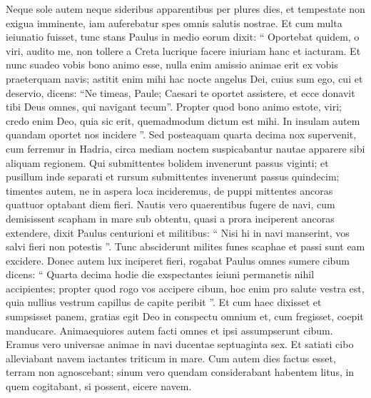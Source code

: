 \begin{biblechapter}
\begin{biblechapter}
\begin{biblechapter}
\begin{biblechapter}
\begin{biblechapter}
\begin{biblechapter}
\begin{biblechapter}
\begin{biblechapter}
\begin{biblechapter}
\begin{biblechapter}
\begin{biblechapter}
\begin{biblechapter}
\begin{biblechapter}
\begin{biblechapter}
\begin{biblechapter}
\begin{biblechapter}
\begin{biblechapter}
\begin{biblechapter}
\begin{biblechapter}
\begin{biblechapter}
\begin{biblechapter}
\begin{biblechapter}
\begin{biblechapter}
\begin{biblechapter}
\begin{biblechapter}
\begin{biblechapter}
\begin{biblechapter}
\verse Neque sole autem neque sideribus apparentibus per plures dies, et tempestate non exigua imminente, iam auferebatur spes omnis salutis nostrae.
 \verse Et cum multa ieiunatio fuisset, tunc stans Paulus in medio eorum dixit: “ Oportebat quidem, o viri, audito me, non tollere a Creta lucrique facere iniuriam hanc et iacturam. 
\verse Et nunc suadeo vobis bono animo esse, nulla enim amissio animae erit ex vobis praeterquam navis; 
\verse astitit enim mihi hac nocte angelus Dei, cuius sum ego, cui et deservio, 
\verse dicens: “Ne timeas, Paule; Caesari te oportet assistere, et ecce donavit tibi Deus omnes, qui navigant tecum”. 
\verse Propter quod bono animo estote, viri; credo enim Deo, quia sic erit, quemadmodum dictum est mihi. 
\verse In insulam autem quandam oportet nos incidere ”. 
\verse Sed posteaquam quarta decima nox supervenit, cum ferremur in Hadria, circa mediam noctem suspicabantur nautae apparere sibi aliquam regionem. 
\verse Qui submittentes bolidem invenerunt passus viginti; et pusillum inde separati et rursum submittentes invenerunt passus quindecim; 
\verse timentes autem, ne in aspera loca incideremus, de puppi mittentes ancoras quattuor optabant diem fieri. 
\verse Nautis vero quaerentibus fugere de navi, cum demisissent scapham in mare sub obtentu, quasi a prora inciperent ancoras extendere, 
\verse dixit Paulus centurioni et militibus: “ Nisi hi in navi manserint, vos salvi fieri non potestis ”. 
\verse Tunc absciderunt milites funes scaphae et passi sunt eam excidere.
 \verse Donec autem lux inciperet fieri, rogabat Paulus omnes sumere cibum dicens: “ Quarta decima hodie die exspectantes ieiuni permanetis nihil accipientes; 
\verse propter quod rogo vos accipere cibum, hoc enim pro salute vestra est, quia nullius vestrum capillus de capite peribit ”. 
\verse Et cum haec dixisset et sumpsisset panem, gratias egit Deo in conspectu omnium et, cum fregisset, coepit manducare. 
\verse Animaequiores autem facti omnes et ipsi assumpserunt cibum. 
 \verse Eramus vero universae animae in navi ducentae septuaginta sex. 
\verse Et satiati cibo alleviabant navem iactantes triticum in mare.
 \verse Cum autem dies factus esset, terram non agnoscebant; sinum vero quendam considerabant habentem litus, in quem cogitabant, si possent, eicere navem. 

\end{biblechapter}
\end{biblechapter}
\end{biblechapter}
\end{biblechapter}
\end{biblechapter}
\end{biblechapter}
\end{biblechapter}
\end{biblechapter}
\end{biblechapter}
\end{biblechapter}
\end{biblechapter}
\end{biblechapter}
\end{biblechapter}
\end{biblechapter}
\end{biblechapter}
\end{biblechapter}
\end{biblechapter}
\end{biblechapter}
\end{biblechapter}
\end{biblechapter}
\end{biblechapter}
\end{biblechapter}
\end{biblechapter}
\end{biblechapter}
\end{biblechapter}
\end{biblechapter}
\end{biblechapter}
